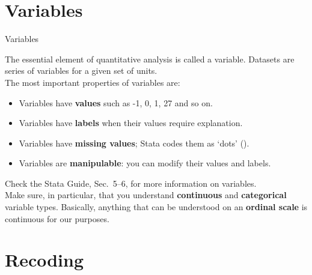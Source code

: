 \documentclass{beamer}
\begin{document}
	
	\section{Variables}

	\begin{frame}[t]{Variables}
	
	The essential element of quantitative analysis is called a variable. Datasets are series of variables for a given set of units.\\[.5em]
	
	The most important properties of variables are:

		\begin{itemize}
		\item Variables have \textbf{values} such as -1, 0, 1, 27 and so on.

		\item Variables have \textbf{labels} when their values require explanation.
		
		\item Variables have \textbf{missing values}; Stata codes them as `dots' ().

		\item Variables are \textbf{manipulable}: you can modify their values and labels.
		\end{itemize}
	
		Check the Stata Guide, Sec.~5--6, for more information on variables.\\[.5em]
		
		Make sure, in particular, that you understand \textbf{continuous} and \textbf{categorical} variable types. Basically, anything that can be understood on an \textbf{ordinal scale} is continuous for our purposes.
		
	\end{frame}
	
	
	\section{Recoding}
\end{document}
